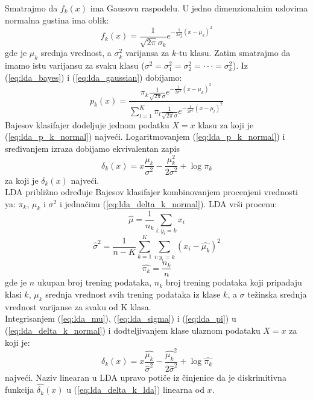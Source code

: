 Smatrajmo da $f_k\left(x\right)$ ima Gausovu raspodelu. U jedno dimenzionalnim
uslovima normalna gustina ima oblik:
\begin{equation} \label{eq:lda_gaussian}
  f_k\left(x\right) =
    \frac {1} {\sqrt{2\pi}\sigma_k}
    e^{-\frac{1}{2 \sigma_k^2} (x - \mu_k)^2}
\end{equation}
gde je $\mu_k$ srednja vrednost, a $\sigma_k^2$ varijansa za $k$-tu klasu. Zatim
smatrajmo da imamo istu varijansu za svaku klasu
($\sigma^2 = \sigma_1^2 = \sigma_2^2 = \cdot\cdot\cdot = \sigma_k^2$). Iz
(\ref{eq:lda_bayes}) i (\ref{eq:lda_gaussian}) dobijamo:
\begin{equation} \label{eq:lda_p_k_normal}
  p_k\left(x\right) =
    \frac
    {\pi_k \frac{1}{\sqrt{2\pi}\sigma} e^{-\frac{1}{2 \sigma^2} (x - \mu_k)^2}}
    {\sum_{l=1}^{K} \pi_l \frac{1}{\sqrt{2\pi}\sigma} e^{-\frac{1}{2 \sigma^2} (x - \mu_l)^2}}
\end{equation}
Bajesov klasifajer dodeljuje jednom podatku $X = x$ klasu za koji je
(\ref{eq:lda_p_k_normal}) najveći. Logaritmovanjem (\ref{eq:lda_p_k_normal}) i
sređivanjem izraza dobijamo ekvivalentan zapis
\begin{equation} \label{eq:lda_delta_k_normal}
  \delta_k\left(x\right) =
    x\frac{\mu_k}{\sigma^2} - \frac{\mu_k^2}{2\sigma^2} + \log{\pi_k}
\end{equation}
za koji je $\delta_k\left(x\right)$ najveći. \\

LDA približno određuje Bajesov klasifajer kombinovanjem procenjeni vrednosti ya:
$\pi_k$, $\mu_k$ i $\sigma^2$ i jednačinu (\ref{eq:lda_delta_k_normal}). LDA
vrši procenu:
\begin{equation} \label{eq:lda_mu} \hat{\mu} = \frac{1}{n_k} \sum_{i:y_i=k} x_i \end{equation}
\begin{equation} \label{eq:lda_sigma} \hat{\sigma}^2 = \frac{1}{n - K} \sum_{k=1}^{K} \sum_{i:y_i=k} (x_i-\hat{\mu_k})^2 \end{equation}
\begin{equation} \label{eq:lda_pi} \hat{\pi_k} = \frac{n_k}{n} \end{equation}
gde je $n$ ukupan broj trening podataka, $n_k$ broj trening podataka koji
pripadaju klasi $k$, $\mu_k$ srednja vrednost svih trening podataka iz klase $k$,
a $\sigma$ težinska srednja vrednost varijanse za svaku od K klasa. \\

Integrisanjem (\ref{eq:lda_mu}), (\ref{eq:lda_sigma}) i (\ref{eq:lda_pi}) u
(\ref{eq:lda_delta_k_normal}) i dodteljivanjem klase ulaznom podataku $X = x$ za
koji je:
\begin{equation} \label{eq:lda_delta_k_lda}
  \hat{\delta_k}\left(x\right) =
    x\frac{\hat{\mu_k}}{\hat{\sigma}^2} - \frac{\hat{\mu_k}^2}{2\hat{\sigma}^2} + \log{\hat{\pi_k}}
\end{equation}
najveći. Naziv linearan u LDA upravo potiče iz činjenice da je diskrimitivna
funkcija $\hat{\delta_k}\left(x\right)$ u (\ref{eq:lda_delta_k_lda}) linearna od
$x$.

